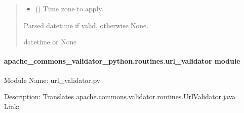 \documentclass[letterpaper,10pt,english]{sphinxmanual}
\begin{document}
\begin{fulllineitems}
\begin{fulllineitems}
\begin{quote}
\begin{description}
\begin{itemize}
\item {} 
\sphinxAtStartPar
{} (\sphinxstyleliteralemphasis{\sphinxupquote{, }}) \textendash{} Time zone to apply.

\end{itemize}

\sphinxAtStartPar
Parsed datetime if valid, otherwise None.

\sphinxAtStartPar
datetime or None

\end{description}\end{quote}

\end{fulllineitems}


\end{fulllineitems}



\paragraph{apache\_commons\_validator\_python.routines.url\_validator module}
\label{\detokenize{apache_commons_validator_python.routines:module-apache_commons_validator_python.routines.url_validator}}\label{\detokenize{apache_commons_validator_python.routines:apache-commons-validator-python-routines-url-validator-module}}
\sphinxAtStartPar
Module Name: url\_validator.py

\sphinxAtStartPar
Description: Translates apache.commons.validator.routines.UrlValidator.java
Link: 
\end{document}
